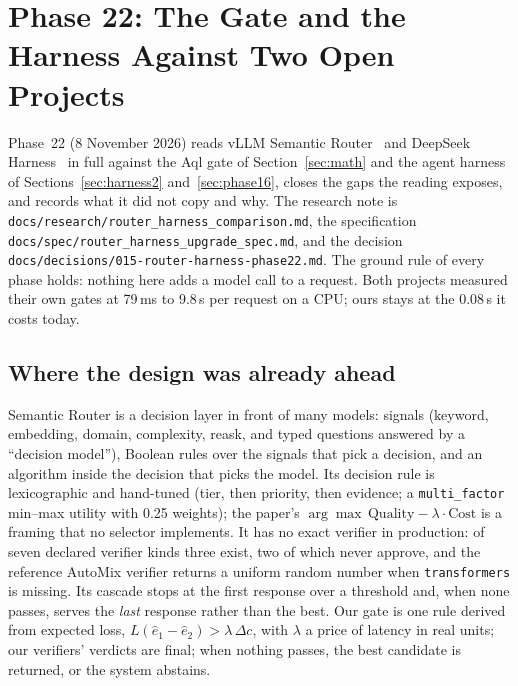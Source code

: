 \section{Phase 22: The Gate and the Harness Against Two Open Projects}
\label{sec:phase22}

Phase~22 (8 November 2026) reads vLLM Semantic Router~\cite{semanticrouter2026} and DeepSeek Harness~\cite{deepseekharness2026} in full against the
Aql gate of Section~\ref{sec:math} and the agent harness of Sections~\ref{sec:harness2} and~\ref{sec:phase16}, closes the gaps the reading exposes, and records what it did not copy and
why. The research note is \texttt{docs/research/router\_harness\_comparison.md}, the specification
\texttt{docs/spec/router\_harness\_upgrade\_spec.md}, and the decision \texttt{docs/decisions/015-router-harness-phase22.md}. The ground rule of every phase
holds: nothing here adds a model call to a request. Both projects measured their own gates at 79\,ms to 9.8\,s per request on a CPU; ours stays at the
0.08\,s it costs today.

\subsection{Where the design was already ahead}

Semantic Router is a decision layer in front of many models: signals (keyword, embedding, domain, complexity, reask, and typed questions answered by a
``decision model''), Boolean rules over the signals that pick a decision, and an algorithm inside the decision that picks the model. Its decision rule is
lexicographic and hand-tuned (tier, then priority, then evidence; a \texttt{multi\_factor} min--max utility with 0.25 weights); the paper's
$\arg\max\,\mathrm{Quality}-\lambda\cdot\mathrm{Cost}$ is a framing that no selector implements. It has no exact verifier in production: of seven declared
verifier kinds three exist, two of which never approve, and the reference AutoMix verifier returns a uniform random number when \texttt{transformers} is
missing. Its cascade stops at the first response over a threshold and, when none passes, serves the \emph{last} response rather than the best. Our gate is
one rule derived from expected loss, $L(\hat e_1-\hat e_2)>\lambda\,\Delta c$, with $\lambda$ a price of latency in real units; our verifiers' verdicts are
final; when nothing passes, the best candidate is returned, or the system abstains.

